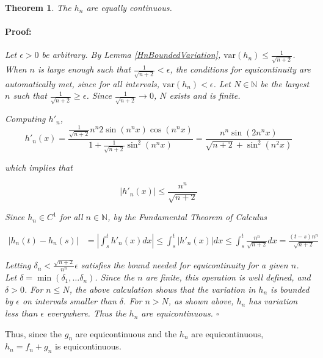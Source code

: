 \documentclass{article}
\newenvironment{proof}{\paragraph{Proof:}}{\hfill$\square$}
\newtheorem{theorem}{Theorem}
\newcommand{\N}{\mathbb{N}}
\newcommand{\var}{\text{var}}
\begin{document}
\begin{theorem}
The $h_n$ are equally continuous.
\begin{proof}
Let $\epsilon > 0$ be arbitrary. By Lemma \ref{HnBoundedVariation}, $\var(h_n) \leq \frac{1}{\sqrt{n+2}}$. When $n$ is large enough such that $\frac{1}{\sqrt{n+2}} < \epsilon$, the conditions for equicontinuity are automatically met, since for all intervals, $\var(h_n) < \epsilon$. Let $N \in \N$ be the largest $n$ such that $\frac{1}{\sqrt{n+2}} \geq \epsilon$. Since $\frac{1}{\sqrt{n+2}} \rightarrow 0$, $N$ exists and is finite.

Computing $h'_n$,
\[
h'_n(x) = \frac {
\frac{1}{\sqrt{n+2}} n^n 2 \sin(n^n x) \cos(n^n x)
}{
1 + \frac{1}{\sqrt{n+2}} \sin^2(n^n x)
} 
= 
\frac{
n^n \sin(2n^nx)
}{
\sqrt{n+2} + \sin^2(n^2 x)
}
\]

which implies that

\[
|h'_n(x)| \leq \frac{n^n}{\sqrt{n+2}}
\]

Since $h_n \in C^1$ for all $n \in \N$, by the Fundamental Theorem of Calculus

\begin{align*}
|h_n(t) - h_n(s)| &= |\int_s^t h'_n(x)dx| \leq \int_s^t |h'_n(x)| dx \leq \int_s^t \frac{n^n}{\sqrt{n+2}} dx = \frac{(t-s)n^n}{\sqrt{n+2}}
\end{align*}

Letting $\delta_n < \frac{\sqrt{n+2}}{n^n}\epsilon$ satisfies the bound needed for equicontinuity for a given $n$. Let $\delta = \min(\delta_1, \dots \delta_n)$. Since the $n$ are finite, this operation is well defined, and $\delta > 0$. For $n \leq N$, the above calculation shows that the variation in $h_n$ is bounded by $\epsilon$ on intervals smaller than $\delta$. For $n > N$, as shown above, $h_n$ has variation less than $\epsilon$ everywhere. Thus the $h_n$ are equicontinuous.
\end{proof}
\end{theorem}

Thus, since the $g_n$ are equicontinuous and the $h_n$ are equicontinuous, $h_n = f_n + g_n$ is equicontinuous.
\end{document}
